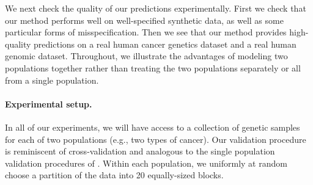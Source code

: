 
We next check the quality of our predictions experimentally. First we check that our method performs well on well-specified synthetic data, as well as some particular forms of misspecification. Then we see that our method provides high-quality predictions on a real human cancer genetics dataset and a real human genomic dataset. Throughout, we illustrate the advantages of modeling two populations together rather than treating the two populations separately or all from a single population.

\paragraph{Experimental setup.} In all of our experiments, we will have access to a collection of genetic samples for each of two populations (e.g., two types of cancer). Our validation procedure is reminiscent of cross-validation and analogous to the single population validation procedures of \citet{Masoero2022,  zou2016quantifying}. Within each population, we uniformly at random choose a partition of the data into 20 equally-sized blocks.  

